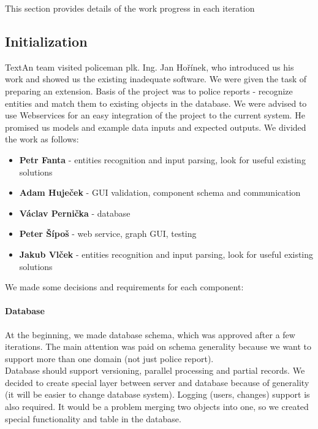 This section provides details of the work progress in each iteration

\subsection{Initialization}
TextAn team visited policeman plk. Ing. Jan Hořínek, who introduced us his work and showed
us the existing inadequate software. We were given the task of preparing an extension. Basis of the
project was to police reports - recognize entities and match them
to existing objects in the database. We were advised to use Webservices for an easy integration of 
the project to the current system. He promised us models and
example data inputs and expected outputs. We divided the work as follows:

\begin{itemize}
\item \textbf{Petr Fanta} - entities recognition and input parsing, look for useful existing solutions
\item \textbf{Adam Huječek} - GUI validation, component schema and communication
\item \textbf{Václav Pernička} - database
\item \textbf{Peter Šípoš} - web service, graph GUI, testing
\item \textbf{Jakub Vlček} - entities recognition and input parsing, look for useful existing solutions
\end{itemize}


We made some decisions and requirements for each component:

\paragraph{Database}
At the beginning, we made database schema, which was approved after a few
iterations. The main attention was paid on schema generality because we want to
support more than one domain (not just police report).\\
Database should support versioning, parallel processing and partial records. We
decided to create special layer between server and database because of
generality (it will be easier to change database system). Logging (users,
changes) support is also required. It would be a problem merging two objects into 
one, so we created special functionality and table in the
database.

